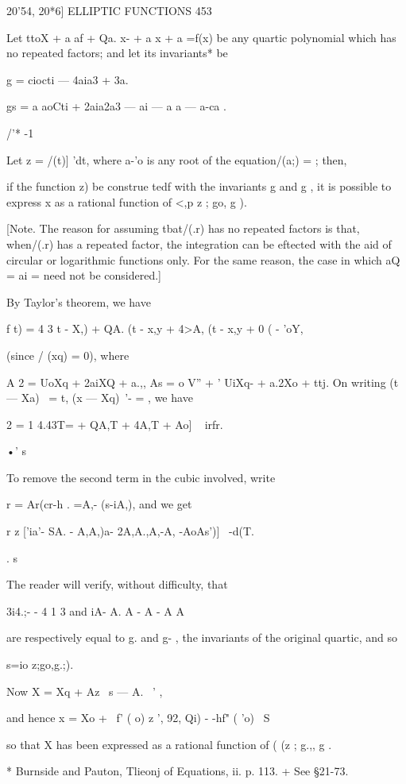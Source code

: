 {20'54, 20*6] ELLIPTIC FUNCTIONS 453 

Let ttoX  +  a af + Qa. x- +  a x + a  =f(x) be any quartic polynomial 
which has no repeated factors; and let its invariants* be 

g  = ciocti — 4aia3 + 3a.  

gs = a aoCti + 2aia2a3 — ai — a a  — a-ca . 

/'* -1 

Let z =  /(t)] 'dt, where a-'o is any root of the equation/(a;) = ; then, 

if the function    z) be construe tedf with the invariants g  and g , it is possible 
to express x as a rational function of <,p z ; go, g ). 

[Note. The reason for assuming tbat/(.r) has no repeated factors is that, when/(.r) 
has a repeated factor, the integration can be eftected with the aid of circular or logarithmic 
functions only. For the same reason, the case in which aQ = ai = need not be considered.] 

By Taylor's theorem, we have 

f t) = 4 3  t - X,) + QA. (t - x,y + 4>A, (t - x,y +  0 (  -  'oY, 

(since / (xq) = 0), where 

A 2 = UoXq  + 2aiXQ + a.,, 
As =  o V'' + ' UiXq- +  a.2Xo + ttj. 
On writing (t — Xa)~  = t, (x — Xq)~'- =  , we have 

2 = 1  4.43T=  + QA,T  + 4A,T + Ao] ~ irfr. 

•' s 

To remove the second term in the cubic involved, write  

r = Ar(cr-h . =A,- (s-iA,), 
and we get 

r   
z  ['ia'- SA. - A,A,)a- 2A,A.,A,-A, -AoAs')]~ -d(T. 

. s 

The reader will verify, without difficulty, that 

3i4.;- - 4 1  3 and iA- A. A - A  - A A  

are respectively equal to g.  and g- , the invariants of the original quartic, 
and so 

s=io z;go,g.;). 

Now X = Xq + Az \ s —  A. ~' , 

and hence x = Xo + \ f' ( o)      z ', 92, Qi) - -hf" ( 'o) ~S 

so that X has been expressed as a rational function of (  (z ; g.,, g . 

* Burnside and Pauton, Tlieonj of Equations, ii. p. 113. 
+ See §21-73. 

}
